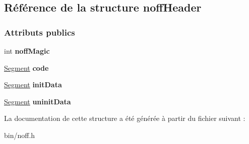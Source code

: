 \hypertarget{structnoff_header}{}\subsection{Référence de la structure noff\+Header}
\label{structnoff_header}
\subsubsection*{Attributs publics}
\begin{DoxyCompactItemize}
\item 
\hypertarget{structnoff_header_a121a20eb53069f59b0bb03a5e4b9fa73}{}\label{structnoff_header_a121a20eb53069f59b0bb03a5e4b9fa73} 
int {\bfseries noff\+Magic}
\item 
\hypertarget{structnoff_header_ab8701e16959da7502011c2a6cdafbb01}{}\label{structnoff_header_ab8701e16959da7502011c2a6cdafbb01} 
\hyperlink{structsegment}{Segment} {\bfseries code}
\item 
\hypertarget{structnoff_header_a6375fd4b1c40f4fb5f0874e97ad6f5a0}{}\label{structnoff_header_a6375fd4b1c40f4fb5f0874e97ad6f5a0} 
\hyperlink{structsegment}{Segment} {\bfseries init\+Data}
\item 
\hypertarget{structnoff_header_a8269329d2dcde604db572e08a63ec1b2}{}\label{structnoff_header_a8269329d2dcde604db572e08a63ec1b2} 
\hyperlink{structsegment}{Segment} {\bfseries uninit\+Data}
\end{DoxyCompactItemize}


La documentation de cette structure a été générée à partir du fichier suivant \+:\begin{DoxyCompactItemize}
\item 
bin/noff.\+h\end{DoxyCompactItemize}
